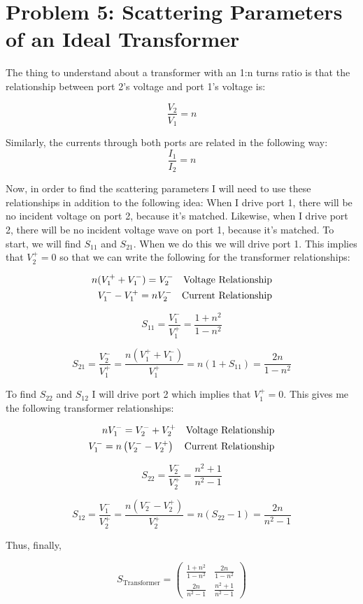 \section*{Problem 5: Scattering Parameters of an Ideal Transformer}
\setcounter{equation}{0}
\addtocounter{section}{1}

The thing to understand about a transformer with an 1:n turns ratio is that the
relationship between port 2's voltage and port 1's voltage is:

\[ 
    \frac{V_2}{V_1} = n 
\]

Similarly, the currents through both ports are related in the following way:
\[ 
    \frac{I_1}{I_2} = n 
\]

Now, in order to find the scattering parameters I will need to use these
relationships in addition to the following idea: When I drive port 1, there will
be no incident voltage on port 2, because it's matched. Likewise, when I drive
port 2, there will be no incident voltage wave on port 1, because it's matched.
To start, we will find $S_{11}$ and $S_{21}$. When we do this we will drive port
1. This implies that $V_2^+ = 0$ so that we can write the following for the
transformer relationships:

\begin{align}
    n(V_1^+ + V_1^-) = V_2^- \text{\quad Voltage Relationship} \label{port1voltage} \\
    V_1^- - V_1^+ = n V_2^- \text{\quad Current Relationship}
    \label{port1current}
\end{align}


\[ 
        S_{11} = \frac{V_1^-}{V_1^+} = \frac{1+n^2}{1-n^2}
\]

\[ 
        S_{21} = \frac{V_2^-}{V_1^+} = \frac{n \left( V_1^+ + V_1^-
        \right)}{V_1^+} = n \left( 1+S_{11} \right) = \frac{2n}{1-n^2}
\]

To find $S_{22}$ and $S_{12}$ I will drive port 2 which implies that $V_1^+ =
0$. This gives me the following transformer relationships:

\begin{align}
    nV_1^- = V_2^- + V_2^+ \text{\quad Voltage Relationship} \label{port1voltage} \\
    V_1^- = n \left( V_2^- -  V_2^+ \right) \text{\quad Current Relationship}
    \label{port1current}
\end{align}

\[ 
        S_{22} = \frac{V_2^-}{V_2^+} = \frac{n^2+1}{n^2-1}
\]

\[ 
        S_{12} = \frac{V_1^-}{V_2^+} = \frac{n \left( V_2^- - V_2^+
        \right)}{V_2^+} = n \left(  S_{22} - 1 \right) = \frac{2n}{n^2-1}
\]

Thus, finally,

\[ 
        S_{\text{Transformer}} = \begin{pmatrix}
            \frac{1+n^2}{1-n^2} & \frac{2n}{1-n^2} \\ \frac{2n}{n^2-1} &
            \frac{n^2+1}{n^2-1}
        \end{pmatrix} 
\]



